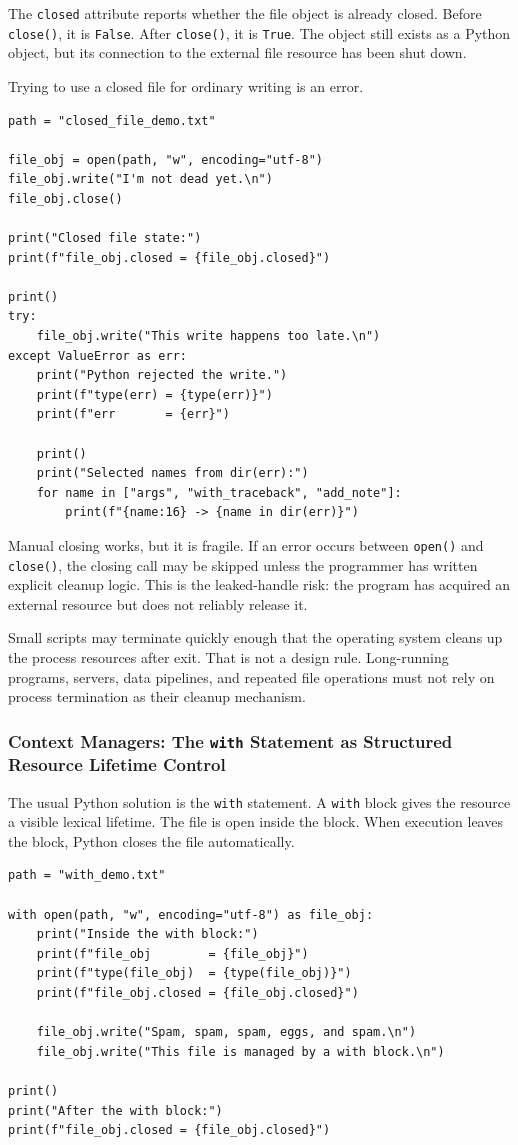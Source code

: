 The \texttt{closed} attribute reports whether the file object is already closed. Before \texttt{close()}, it is \texttt{False}. After \texttt{close()}, it is \texttt{True}. The object still exists as a Python object, but its connection to the external file resource has been shut down.

Trying to use a closed file for ordinary writing is an error.

\begin{verbatim}
path = "closed_file_demo.txt"

file_obj = open(path, "w", encoding="utf-8")
file_obj.write("I'm not dead yet.\n")
file_obj.close()

print("Closed file state:")
print(f"file_obj.closed = {file_obj.closed}")

print()
try:
    file_obj.write("This write happens too late.\n")
except ValueError as err:
    print("Python rejected the write.")
    print(f"type(err) = {type(err)}")
    print(f"err       = {err}")

    print()
    print("Selected names from dir(err):")
    for name in ["args", "with_traceback", "add_note"]:
        print(f"{name:16} -> {name in dir(err)}")
\end{verbatim}

Manual closing works, but it is fragile. If an error occurs between \texttt{open()} and \texttt{close()}, the closing call may be skipped unless the programmer has written explicit cleanup logic. This is the leaked-handle risk: the program has acquired an external resource but does not reliably release it.

Small scripts may terminate quickly enough that the operating system cleans up the process resources after exit. That is not a design rule. Long-running programs, servers, data pipelines, and repeated file operations must not rely on process termination as their cleanup mechanism.

\subsubsection{Context Managers: The \texttt{with} Statement as Structured Resource Lifetime Control}

The usual Python solution is the \texttt{with} statement. A \texttt{with} block gives the resource a visible lexical lifetime. The file is open inside the block. When execution leaves the block, Python closes the file automatically.

\begin{verbatim}
path = "with_demo.txt"

with open(path, "w", encoding="utf-8") as file_obj:
    print("Inside the with block:")
    print(f"file_obj        = {file_obj}")
    print(f"type(file_obj)  = {type(file_obj)}")
    print(f"file_obj.closed = {file_obj.closed}")

    file_obj.write("Spam, spam, spam, eggs, and spam.\n")
    file_obj.write("This file is managed by a with block.\n")

print()
print("After the with block:")
print(f"file_obj.closed = {file_obj.closed}")
\end{verbatim}

